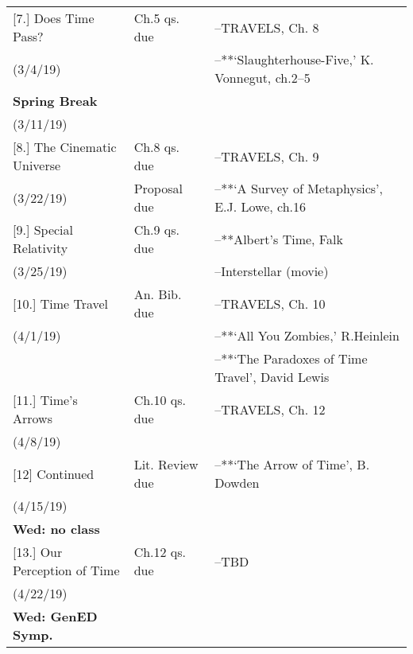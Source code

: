 \documentclass[article,oneside]{memoir}
\begin{document}
\begin{center}
\begin{longtable}{p{4.5cm}p{2.5cm}p{5cm}}
[7.] Does Time Pass?		& Ch.5 qs. due		& --TRAVELS, Ch. 8  \\ 
(3/4/19)			        		&		    	  					&  --**`Slaughterhouse-Five,' K. Vonnegut, ch.2--5 \\  [1.8\baselineskip] 

\textbf{Spring Break}		    		& 		  						&  \\
(3/11/19)			        		&		    		  				&  \\ [1.8\baselineskip]

[8.]   	The Cinematic Universe 	 & Ch.8 qs. due	   		&  --TRAVELS, Ch. 9\\
(3/22/19)				         &  Proposal due			& --**`A Survey of Metaphysics', E.J. Lowe, ch.16  \\[1.8\baselineskip]	

[9.] Special Relativity 		& Ch.9 qs. due		& --**Albert's Time, Falk \\
(3/25/19)				      	&		 & --Interstellar (movie)  \\  [1.8\baselineskip]

[10.] Time Travel			& An. Bib. due			& --TRAVELS, Ch. 10  \\
(4/1/19)		            		&		      & --**`All You Zombies,'  R.Heinlein \\ 
						&			& --**`The Paradoxes of Time Travel', David Lewis \\ [1.8\baselineskip]


[11.] Time's Arrows			& Ch.10 qs. due		& --TRAVELS, Ch. 12 \\
(4/8/19)		 		 &		    	&  \\ [1.8\baselineskip]




[12] Continued		 	& Lit. Review due	& --**`The Arrow of Time', B. Dowden\\
(4/15/19)				&  	 & \\
\textbf{Wed: no class}	&	& \\ [1.8\baselineskip]

[13.] Our Perception of Time 	& Ch.12 qs. due	& --TBD\\
(4/22/19)			      		& 				&  \\
\textbf{Wed: GenED Symp.}	&				&		\\[1.8\baselineskip]



\end{longtable}
\end{center}
\end{document}
